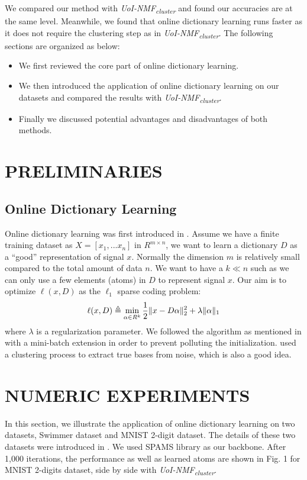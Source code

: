 \documentclass[conference]{IEEEtran}
\begin{document}
We compared our method with \textit{UoI-NMF\textsubscript{cluster}} \cite{b5} and found our accuracies are at the same level. Meanwhile, we found that online dictionary learning runs faster as it does not require the clustering step as in \textit{UoI-NMF\textsubscript{cluster}}. The following sections are organized as below:

\begin{itemize}
\item We first reviewed the core part of online dictionary learning.
\item We then introduced the application of online dictionary learning on our datasets and compared the results with \textit{UoI-NMF\textsubscript{cluster}}.
\item Finally we discussed potential advantages and disadvantages of both methods.
\end{itemize}

\section{PRELIMINARIES}
\subsection{Online Dictionary Learning}

Online dictionary learning was first introduced in \cite{b4}. Assume we have a finite training dataset as $ X=[x_1,...x_n] $ in $R^{m\times n}$, we want to learn a dictionary $D$ as a ``good'' representation of signal $x$. Normally the dimension $m$ is relatively small compared to the total amount of data $n$. We want to have a $k\ll n$ such as we can only use a few elements (atoms) in $D$ to represent signal $x$. Our aim is to optimize $\ell(x, D)$ as the $\ell_{1}$ sparse coding problem:
$$ \ell(x, D) \triangleq \min\limits_{\alpha \in R^k} \frac{1}{2}\Arrowvert x-D\alpha \Arrowvert^{2}_{2}+\lambda\Arrowvert \alpha \Arrowvert_{1}$$
where $ \lambda $ is a regularization parameter. We followed the algorithm as
mentioned in \cite{b4} with a mini-batch extension in order to prevent polluting the initialization. \cite{b5} used a clustering process to extract true bases from noise, which is also a good idea.

\section{NUMERIC EXPERIMENTS}
In this section, we illustrate the application of online dictionary learning on two datasets, Swimmer dataset and MNIST 2-digit dataset. The details of these two datasets were introduced in \cite{b5}. We used SPAMS library \cite{b6,b7} as our backbone. After 1,000 iterations, the performance as well as learned atoms are shown in Fig. 1 for MNIST 2-digits dataset, side by side with \textit{UoI-NMF\textsubscript{cluster}}.
\end{document}
